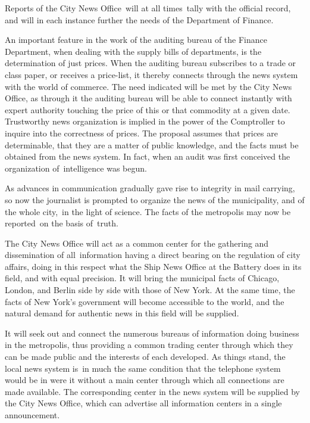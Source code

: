 \documentclass[twoside,symmetric,nobib,justified]{tufte-book}
\begin{document}
Reports of the City News Office~will at all times~tally with the
official record, and will in each instance further the needs of the
Department of Finance.~

An important feature in the work of the auditing bureau of the Finance
Department, when dealing with the supply bills of departments, is the
determination of just prices. When the auditing bureau subscribes to a
trade or class paper, or receives a price-list, it thereby connects
through the news system with the world of commerce. The need indicated
will be met by the City News Office, as through it the auditing bureau
will be able to connect instantly with expert authority touching the
price of this or that commodity at a given date. Trustworthy news
organization is implied in the power of the Comptroller to inquire into
the correctness of prices. The proposal assumes that prices are
determinable, that they are a matter of public knowledge, and the facts
must be obtained from the news system. In fact, when an audit was first
conceived the organization of~intelligence was begun.~

\newpage As advances in communication gradually gave rise to integrity in mail
carrying, so now the journalist is prompted to organize the news of the
municipality, and of the whole city,~in the light of science. The facts
of the metropolis may now be reported~on the basis of~truth.~

The City News Office will act as a common center for the gathering and
dissemination of all~information having a direct bearing on the
regulation of city affairs, doing in this respect what the Ship News
Office at the Battery does in its field, and with equal precision. It
will bring the municipal facts of Chicago, London, and Berlin side by
side with those of New York. At the same time, the facts of New York's
government will become accessible to the world, and the natural demand
for authentic news in this field will be supplied.~

It will seek out and connect the numerous bureaus of information doing
business in the metropolis, thus providing a common trading center
through which they can be made public and the interests of each
developed. As things stand, the local news system is~in much the same
condition that the telephone system would be in were it without a main
center through which all connections are made available. The
corresponding center in the news system will be supplied by the City
News Office, which can advertise all information centers in a single
announcement.~~
\end{document}
